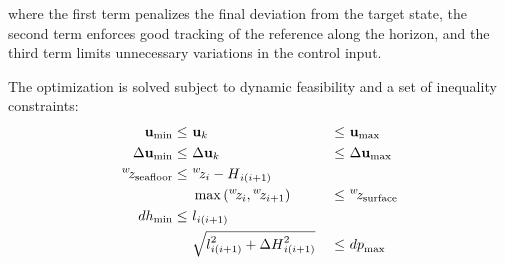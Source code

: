 where the first term penalizes the final deviation from the target state, the second term enforces
good tracking of the reference along the horizon, and the third term limits unnecessary variations
in the control input.

The optimization is solved subject to dynamic feasibility and a set of inequality constraints:
\begin{alignat}{3}
	\ldvect{u}{\text{min}}           \leq & ~\ldvect{u}{k}                                                           & ~\leq & ~\ldvect{u}{\text{max}} \nonumber         \\
	\Delta   \ldvect{u}{\text{min}}  \leq & ~\Delta\ldvect{u}{k}                                                     & ~\leq & ~\Delta\ldvect{u}{\text{max}} \nonumber   \\
	\ldcoord{z}{w}{\text{seafloor}}  \leq & ~\ldcoord{z}{w}{i} - \ldscal{\catH{}}{i(i+1)}                            & ~     & ~\nonumber                                \\
	                                      & ~\max{\left(\ldcoord{z}{w}{i}, \ldcoord{z}{w}{i+1}\right)}               & ~\leq & ~\ldcoord{z}{w}{\text{surface}} \nonumber \\
	\ldscal{dh}{\text{min}}         \leq  & ~\ldscal{\catl{}}{i(i+1)}                                                & ~     & ~\nonumber                                \\
	                                      & ~\sqrt{\llscal{\catl{}}{2}{i(i+1)} + \Delta \llscal{\catH{}}{2}{i(i+1)}} & ~\leq & ~\ldscal{dp}{\text{max}} \nonumber        \\
	\label{rcc_c_mpc_constraints}
\end{alignat}

